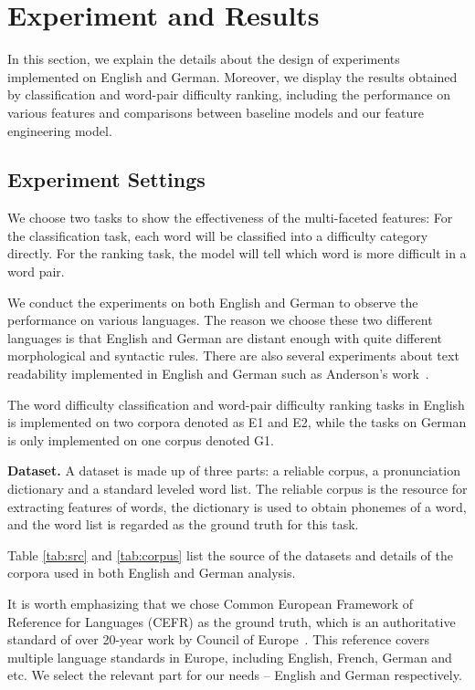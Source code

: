 \section{Experiment and Results}
\label{sec:eval}

In this section, we explain the details about the design of experiments implemented on English and German.
Moreover, we display the results obtained by classification and word-pair difficulty ranking, including the performance on various features and comparisons between baseline models and our feature engineering model.

\subsection{Experiment Settings}
\label{sec:exper}
We choose two tasks to show the effectiveness of the multi-faceted features: For the classification task, each word will be classified into a difficulty category directly. For the ranking task, the model will tell which word is more difficult in a word pair.

We conduct the experiments on both English and German to observe the performance on various languages. 
The reason we choose these two different languages is that English and German are distant enough with quite different morphological and syntactic rules. 
There are also several experiments about text readability implemented in English and German such as Anderson's work~.

The word difficulty classification and word-pair difficulty ranking tasks in English is implemented on two corpora denoted as E1 and E2,
while the tasks on German is only implemented on one corpus denoted G1.

\textbf{Dataset.} 
A dataset is made up of three parts: a reliable corpus, a pronunciation dictionary and a standard leveled word list. The reliable corpus is the resource for extracting features of words, the dictionary is used to obtain phonemes of a word, and the word list is regarded as the ground truth for this task.

Table \ref{tab:src} and \ref{tab:corpus} list the source of the datasets and details of the corpora used in both English and German analysis.

It is worth emphasizing that we chose Common European Framework of Reference for Languages  (CEFR) as the ground truth, which is an authoritative standard of over 20-year work by Council of Europe~\cite{little2006common,little2011common}. 
This reference covers multiple language standards in Europe, including English, French, German and etc.
We select the relevant part for our needs -- English and German respectively.


